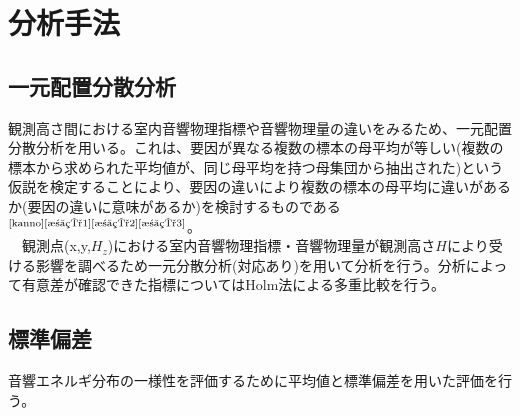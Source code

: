 \chapter{分析手法}

\section{一元配置分散分析}
観測高さ間における室内音響物理指標や音響物理量の違いをみるため、一元配置分散分析を用いる。これは、要因が異なる複数の標本の母平均が等しい(複数の標本から求められた平均値が、同じ母平均を持つ母集団から抽出された)という仮説を検定することにより、要因の違いにより複数の標本の母平均に違いがあるか(要因の違いに意味があるか)を検討するものである$^{\text{\cite{kanno}{\cite{池田1}{\cite{池田2}{\cite{池田3}}}}}}$。
\\　観測点(x,y,$H_z$)における室内音響物理指標・音響物理量が観測高さ$H$により受ける影響を調べるため一元分散分析(対応あり)を用いて分析を行う。分析によって有意差が確認できた指標についてはHolm法による多重比較を行う。

\section{標準偏差}
音響エネルギ分布の一様性を評価するために平均値と標準偏差を用いた評価を行う。

